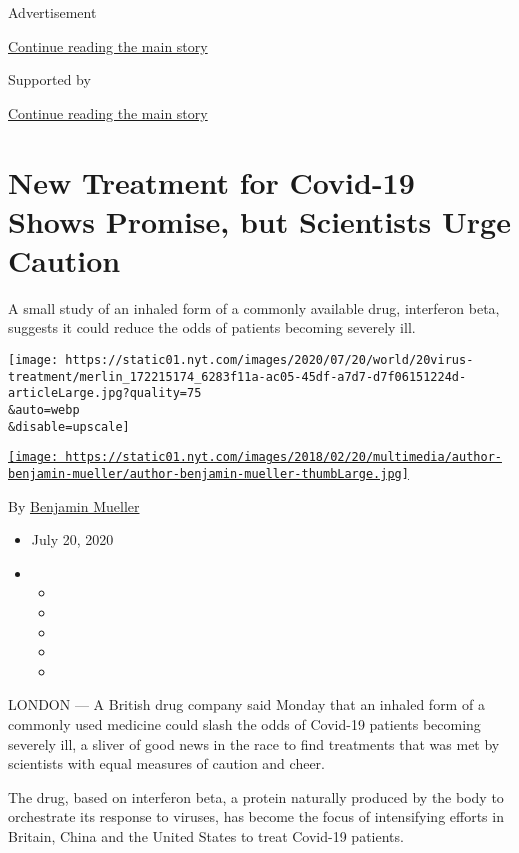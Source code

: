 Advertisement

\protect\hyperlink{after-top}{Continue reading the main story}

Supported by

\protect\hyperlink{after-sponsor}{Continue reading the main story}

\hypertarget{new-treatment-for-covid-19-shows-promise-but-scientists-urge-caution}{%
\section{New Treatment for Covid-19 Shows Promise, but Scientists Urge
Caution}\label{new-treatment-for-covid-19-shows-promise-but-scientists-urge-caution}}

A small study of an inhaled form of a commonly available drug,
interferon beta, suggests it could reduce the odds of patients becoming
severely ill.

\texttt{[image: https://static01.nyt.com/images/2020/07/20/world/20virus-treatment/merlin\_172215174\_6283f11a-ac05-45df-a7d7-d7f06151224d-articleLarge.jpg?quality=75\\\&auto=webp\\\&disable=upscale]}

\href{https://www.nytimes.com/by/benjamin-mueller}{\texttt{[image: https://static01.nyt.com/images/2018/02/20/multimedia/author-benjamin-mueller/author-benjamin-mueller-thumbLarge.jpg]}}

By \href{https://www.nytimes.com/by/benjamin-mueller}{Benjamin Mueller}

\begin{itemize}
\item
  July 20, 2020
\item
  \begin{itemize}
  \item
  \item
  \item
  \item
  \item
  \end{itemize}
\end{itemize}

LONDON --- A British drug company said Monday that an inhaled form of a
commonly used medicine could slash the odds of Covid-19 patients
becoming severely ill, a sliver of good news in the race to find
treatments that was met by scientists with equal measures of caution and
cheer.

The drug, based on interferon beta, a protein naturally produced by the
body to orchestrate its response to viruses, has become the focus of
intensifying efforts in Britain, China and the United States to treat
Covid-19 patients.

